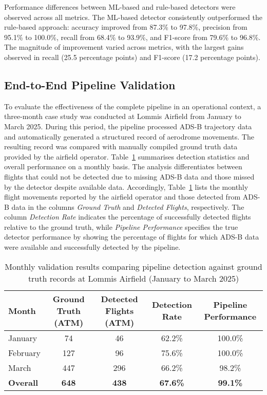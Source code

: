 \documentclass[
  manuscript=proceedings,  %
  layout=preprint,         %
  year=2025,
  volume=x,
]{extra/joas}
\begin{document}
Performance differences between ML-based and rule-based detectors were observed across all metrics. The ML-based detector consistently outperformed the rule-based approach: accuracy improved from 87.3\% to 97.8\%, precision from 95.1\% to 100.0\%, recall from 68.4\% to 93.9\%, and F1-score from 79.6\% to 96.8\%. The magnitude of improvement varied across metrics, with the largest gains observed in recall (25.5 percentage points) and F1-score (17.2 percentage points).

\subsection{End-to-End Pipeline Validation}
To evaluate the effectiveness of the complete pipeline in an operational context, a three-month case study was conducted at Lommis Airfield from January to March 2025. During this period, the pipeline processed ADS-B trajectory data and automatically generated a structured record of aerodrome movements. The resulting record was compared with manually compiled ground truth data provided by the airfield operator. Table~\ref{tab:validation_summary} summarises detection statistics and overall performance on a monthly basis. The analysis differentiates between flights that could not be detected due to missing ADS-B data and those missed by the detector despite available data. Accordingly, Table~\ref{tab:validation_summary} lists the monthly flight movements reported by the airfield operator and those detected from ADS-B data in the columns \textit{Ground Truth} and \textit{Detected Flights}, respectively. The column \textit{Detection Rate} indicates the percentage of successfully detected flights relative to the ground truth, while \textit{Pipeline Performance} specifies the true detector performance by showing the percentage of flights for which ADS-B data were available and successfully detected by the pipeline.

\begin{table}[h!]
\centering
\caption{Monthly validation results comparing pipeline detection against ground truth records at Lommis Airfield (January to March 2025)}
\label{tab:validation_summary}
\begin{tabular}{lcccc}
\toprule
\textbf{Month} & \textbf{Ground Truth (ATM)} & \textbf{Detected Flights (ATM)} & \textbf{Detection Rate} & \textbf{Pipeline Performance} \\
\midrule
January     & 74    & 46    & 62.2\% & 100.0\%  \\
February    & 127   & 96    & 75.6\% & 100.0\%  \\
March       & 447   & 296   & 66.2\% & 98.2\%   \\
\midrule
\textbf{Overall} & \textbf{648} & \textbf{438} & \textbf{67.6\%} & \textbf{99.1\%} \\
\bottomrule
\end{tabular}
\end{table}
\end{document}
